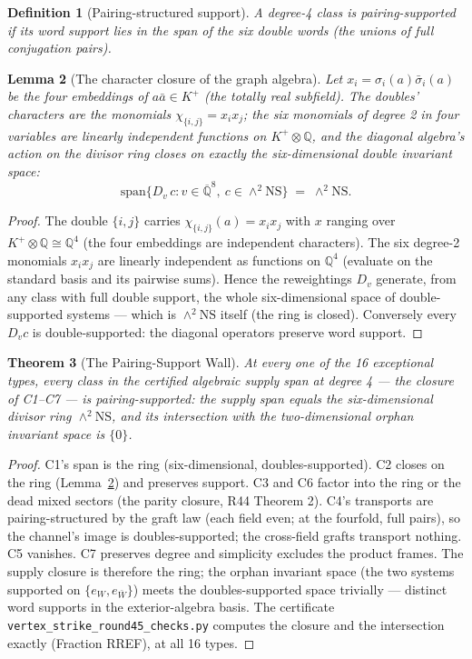 \documentclass[11pt]{article}
\newtheorem{theorem}{Theorem}
\newtheorem{lemma}[theorem]{Lemma}
\newtheorem{definition}[theorem]{Definition}
\begin{document}
\begin{definition}[Pairing-structured support]
A degree-4 class is \emph{pairing-supported} if its word support lies in the span of the
six double words (the unions of full conjugation pairs).
\end{definition}

\begin{lemma}[The character closure of the graph algebra]\label{lem:characters}
Let $x_i = \sigma_i(a)\bar\sigma_i(a)$ be the four embeddings of $a\bar a \in K^+$
(the totally real subfield).  The doubles' characters are the monomials
$\chi_{\{i,j\}} = x_i x_j$; the six monomials of degree 2 in four variables are
linearly independent functions on $K^+ \otimes \mathbb{Q}$, and the diagonal algebra's
action on the divisor ring closes on exactly the six-dimensional double invariant space:
\[
\mathrm{span}\bigl\{D_v\,c : v \in \overline{\mathbb{Q}}^8,\ c \in \wedge^2\mathrm{NS}\bigr\}
\;=\; \wedge^2\mathrm{NS}.
\]
\end{lemma}

\begin{proof}
The double $\{i,j\}$ carries $\chi_{\{i,j\}}(a) = x_ix_j$ with $x$ ranging over
$K^+\otimes\mathbb{Q} \cong \mathbb{Q}^4$ (the four embeddings are independent characters).
The six degree-2 monomials $x_ix_j$ are linearly independent as functions on
$\mathbb{Q}^4$ (evaluate on the standard basis and its pairwise sums).  Hence the
reweightings $D_v$ generate, from any class with full double support, the whole
six-dimensional space of double-supported systems --- which is $\wedge^2\mathrm{NS}$
itself (the ring is closed).  Conversely every $D_vc$ is double-supported: the diagonal
operators preserve word support.
\end{proof}

\begin{theorem}[The Pairing-Support Wall]\label{thm:wall}
At every one of the 16 exceptional types, every class in the certified algebraic supply
span at degree 4 --- the closure of C1--C7 --- is pairing-supported: the supply span
equals the six-dimensional divisor ring $\wedge^2\mathrm{NS}$, and its intersection with
the two-dimensional orphan invariant space is $\{0\}$.
\end{theorem}

\begin{proof}
C1's span is the ring (six-dimensional, doubles-supported).  C2 closes on the ring
(Lemma~\ref{lem:characters}) and preserves support.  C3 and C6 factor into the ring or the
dead mixed sectors (the parity closure, R44 Theorem 2).  C4's transports are
pairing-structured by the graft law (each field even; at the fourfold, full pairs), so the
channel's image is doubles-supported; the cross-field grafts transport nothing.  C5
vanishes.  C7 preserves degree and simplicity excludes the product frames.  The supply
closure is therefore the ring; the orphan invariant space (the two systems supported on
$\{e_W, e_{\bar W}\}$) meets the doubles-supported space trivially --- distinct word
supports in the exterior-algebra basis.  The certificate \texttt{vertex\_strike\_round45\_checks.py}
computes the closure and the intersection exactly (Fraction RREF), at all 16 types.
\end{proof}
\end{document}
